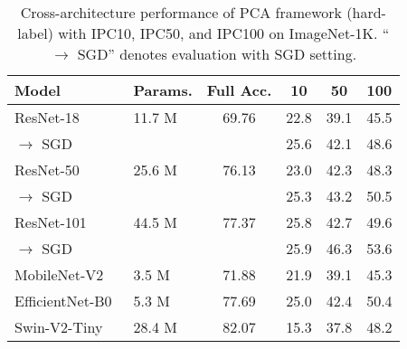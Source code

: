 \begin{table}[t]
\caption{Cross-architecture performance of PCA framework (hard-label) with IPC10, IPC50, and IPC100 on ImageNet-1K.
``$\rightarrow$ SGD'' denotes evaluation with SGD setting.
}
\label{tab:cross-arch}
\centering
\scriptsize
\setlength{\tabcolsep}{0.6em}
\begin{tabular}{@{}llc|ccc@{}}
\toprule
Model           & Params. & Full Acc. & 10   & 50   & 100  \\ \midrule
ResNet-18~\cite{he2016deep}       & 11.7 M               & 69.76     & 22.8 & 39.1 & 45.5 \\
$\rightarrow$ SGD       &                &      & 25.6 & 42.1 & 48.6 \\ \midrule
ResNet-50~\cite{he2016deep}       & 25.6 M               & 76.13     & 23.0 & 42.3 & 48.3 \\
$\rightarrow$ SGD       &                &      & 25.3 & 43.2 & 50.5 \\ \midrule
ResNet-101~\cite{he2016deep}      & 44.5 M                & 77.37     & 25.8 & 42.7 & 49.6 \\
$\rightarrow$ SGD       &                &      & 25.9 & 46.3 & 53.6 \\ \midrule
MobileNet-V2~\cite{sandler2018mobilenetv2}    & 3.5 M    & 71.88     & 21.9 & 39.1 & 45.3 \\
EfficientNet-B0~\cite{tan2019efficientnet} & 5.3 M       & 77.69     & 25.0 & 42.4 & 50.4 \\
Swin-V2-Tiny~\cite{liu2022swin}    & 28.4 M              & 82.07     & 15.3 & 37.8 & 48.2 \\ \bottomrule
\end{tabular}
\end{table}
